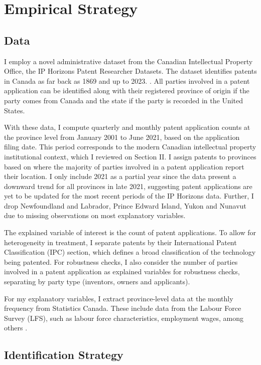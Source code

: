 \documentclass[../main.tex]{subfiles}
\begin{document}
\section{Empirical Strategy}
\label{sec:empirical_strategy}

\subsection{Data}

I employ a novel administrative dataset from the Canadian Intellectual Property Office, the IP Horizons Patent Researcher Datasets. The dataset identifies patents in Canada as far back as 1869 and up to 2023. \parencite*{patents_cipo_datasets}. All parties involved in a patent application can be identified along with their registered province of origin if the party comes from Canada and the state if the party is recorded in the United States.  

With these data, I compute quarterly and monthly patent application counts at the province level from January 2001 to June 2021, based on the application filing date. This period corresponds to the modern Canadian intellectual property institutional context, which I reviewed on Section II. I assign patents to provinces based on where the majority of parties involved in a patent application report their location. I only include 2021 as a partial year since the data present a downward trend for all provinces in late 2021, suggesting patent applications are yet to be updated for the most recent periods of the IP Horizons data. Further, I drop Newfoundland and Labrador, Prince Edward Island, Yukon and Nunavut due to missing observations on most explanatory variables. 

The explained variable of interest is the count of patent applications. To allow for heterogeneity in treatment, I separate patents by their International Patent Classification (IPC) section, which defines a broad classification of the technology being patented. For robustness checks, I also consider the number of parties involved in a patent application as explained variables for robustness checks, separating by party type (inventors, owners and applicants).

For my explanatory variables, I extract province-level data at the monthly frequency from Statistics Canada. These include data from the Labour Force Survey (LFS), such as labour force characteristics, employment wages, among others \parencite*{lfs_lfc_table,lfs_employee_wages,statisticscanada24,statisticscanada24b}. 


\subsection{Identification Strategy}
\end{document}
